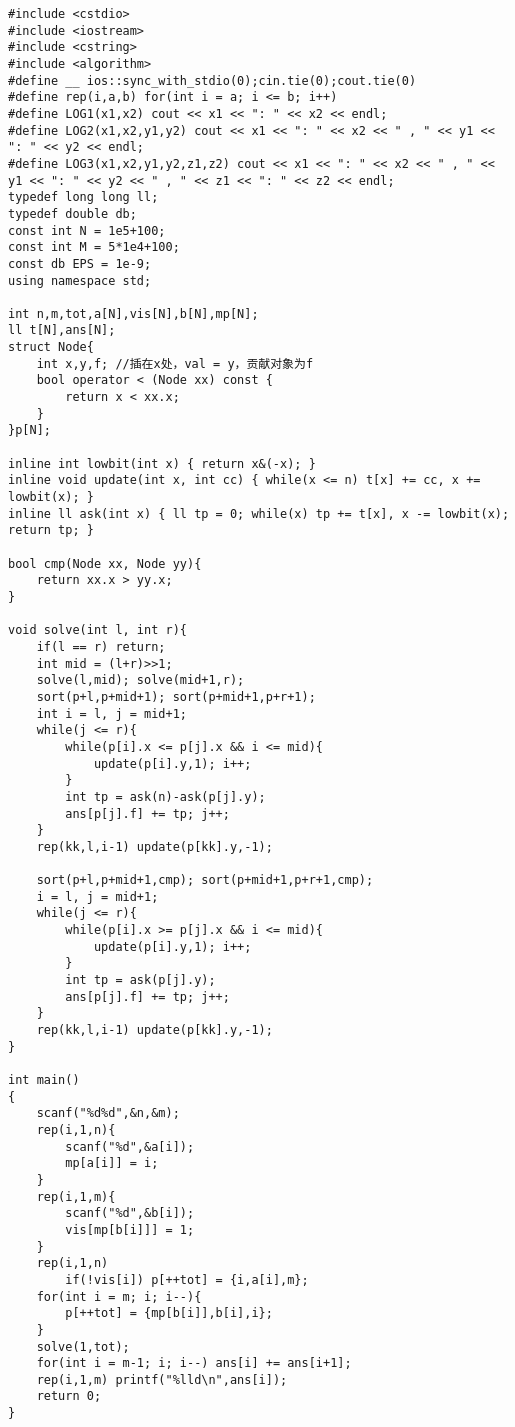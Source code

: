 \documentclass[twoside]{article}
\begin{document}
\begin{lstlisting}
#include <cstdio>
#include <iostream>
#include <cstring>
#include <algorithm>
#define __ ios::sync_with_stdio(0);cin.tie(0);cout.tie(0)
#define rep(i,a,b) for(int i = a; i <= b; i++)
#define LOG1(x1,x2) cout << x1 << ": " << x2 << endl;
#define LOG2(x1,x2,y1,y2) cout << x1 << ": " << x2 << " , " << y1 << ": " << y2 << endl;
#define LOG3(x1,x2,y1,y2,z1,z2) cout << x1 << ": " << x2 << " , " << y1 << ": " << y2 << " , " << z1 << ": " << z2 << endl;
typedef long long ll;
typedef double db;
const int N = 1e5+100;
const int M = 5*1e4+100;
const db EPS = 1e-9;
using namespace std;

int n,m,tot,a[N],vis[N],b[N],mp[N];
ll t[N],ans[N];
struct Node{
	int x,y,f; //插在x处，val = y，贡献对象为f
	bool operator < (Node xx) const {
		return x < xx.x;
	}
}p[N];

inline int lowbit(int x) { return x&(-x); }
inline void update(int x, int cc) { while(x <= n) t[x] += cc, x += lowbit(x); }
inline ll ask(int x) { ll tp = 0; while(x) tp += t[x], x -= lowbit(x); return tp; }

bool cmp(Node xx, Node yy){
	return xx.x > yy.x;
}

void solve(int l, int r){
	if(l == r) return;
	int mid = (l+r)>>1;
	solve(l,mid); solve(mid+1,r);
	sort(p+l,p+mid+1); sort(p+mid+1,p+r+1);
	int i = l, j = mid+1;
	while(j <= r){
		while(p[i].x <= p[j].x && i <= mid){
			update(p[i].y,1); i++;
		}
		int tp = ask(n)-ask(p[j].y);
		ans[p[j].f] += tp; j++;
	}
	rep(kk,l,i-1) update(p[kk].y,-1);

	sort(p+l,p+mid+1,cmp); sort(p+mid+1,p+r+1,cmp);
	i = l, j = mid+1;
	while(j <= r){
		while(p[i].x >= p[j].x && i <= mid){
			update(p[i].y,1); i++;
		}
		int tp = ask(p[j].y);
		ans[p[j].f] += tp; j++;
	}
	rep(kk,l,i-1) update(p[kk].y,-1);
}

int main()
{
	scanf("%d%d",&n,&m);
	rep(i,1,n){
		scanf("%d",&a[i]);
		mp[a[i]] = i;
	} 
	rep(i,1,m){
		scanf("%d",&b[i]);
		vis[mp[b[i]]] = 1;
	}
	rep(i,1,n)
		if(!vis[i]) p[++tot] = {i,a[i],m};
	for(int i = m; i; i--){
		p[++tot] = {mp[b[i]],b[i],i};
	} 
	solve(1,tot);
	for(int i = m-1; i; i--) ans[i] += ans[i+1];
	rep(i,1,m) printf("%lld\n",ans[i]);
	return 0;
}\end{lstlisting}
\end{document}
